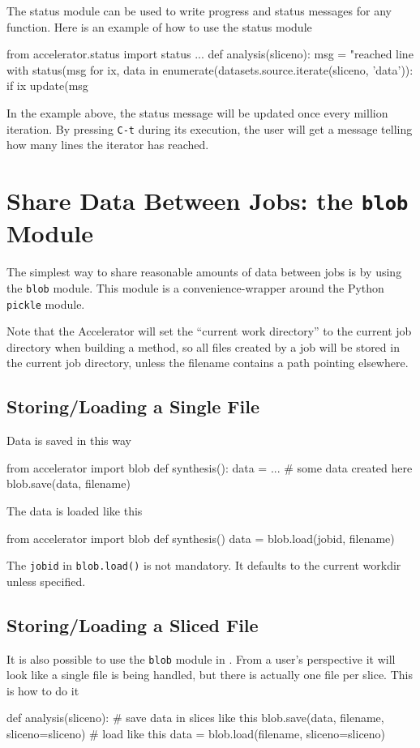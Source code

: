 The status module can be used to write progress and status messages
for any function.  Here is an example of how to use the status module
\begin{python}
from accelerator.status import status
...
def analysis(sliceno):
    msg = "reached line %
    with status(msg %
        for ix, data in enumerate(datasets.source.iterate(sliceno, 'data')):
            if ix %
                update(msg %
\end{python}
In the example above, the status message will be updated once every
million iteration.  By pressing \texttt{C-t} during its execution, the
user will get a message telling how many lines the iterator has
reached.





\section{Share Data Between Jobs:  the \texttt{blob} Module}

The simplest way to share reasonable amounts of data between jobs is
by using the \texttt{blob} module.  This module is a
convenience-wrapper around the Python \texttt{pickle} module.

Note that the Accelerator will set the ``current work directory'' to
the current job directory when building a method, so all files created
by a job will be stored in the current job directory, unless the
filename contains a path pointing elsewhere.

\subsection*{Storing/Loading a  Single File}
Data is saved in this way
\begin{python}
from accelerator import blob
def synthesis():
    data = ...  # some data created here
    blob.save(data, filename)
\end{python}
The data is loaded like this
\begin{python}
from accelerator import blob
def synthesis()
    data = blob.load(jobid, filename)
\end{python}
The \texttt{jobid} in \texttt{blob.load()} is not mandatory.  It
defaults to the current workdir unless specified.



\subsection{Storing/Loading a Sliced File}
It is also possible to use the \texttt{blob} module in \analysis.
From a user's perspective it will look like a single file is being
handled, but there is actually one file per slice.  This is how to do
it
\begin{python}
def analysis(sliceno):
    # save data in slices like this
    blob.save(data, filename, sliceno=sliceno)
    # load like this
    data = blob.load(filename, sliceno=sliceno)
\end{python}

